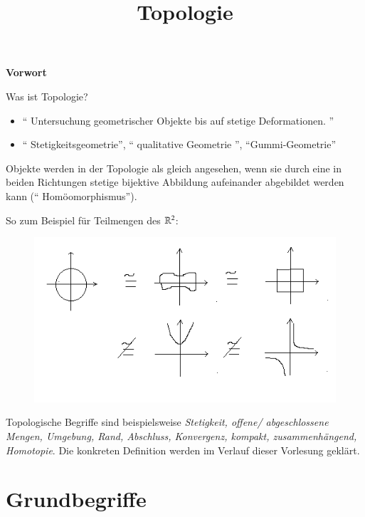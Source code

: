 \documentclass[a4paper,10pt]{scrartcl}
\title{Topologie}
\begin{document}
\maketitle

\tableofcontents
\newpage
\begin{center}
\LARGE\textbf{Vorwort}
\end{center}
\begin{seg}{Was ist Topologie?}
\begin{itemize}
\item "` Untersuchung geometrischer Objekte bis auf stetige Deformationen. "'
\item "` Stetigkeitsgeometrie"', "` qualitative Geometrie "', "`Gummi-Geometrie"'
\end{itemize}
Objekte werden in der Topologie als gleich angesehen, wenn sie durch eine in beiden Richtungen stetige bijektive Abbildung aufeinander abgebildet werden kann ("` Homöomorphismus"').
\end{seg}
So zum Beispiel für Teilmengen des $\mathbb{R}^2$:
\begin{figure}[h]
\includegraphics[scale=0.7]{fig1.png}
\end{figure}
\begin{ex*} 
Topologische Begriffe sind beispielsweise \emph{Stetigkeit, offene/ abgeschlossene Mengen, Umgebung, Rand, Abschluss, Konvergenz, kompakt, zusammenhängend, Homotopie}.  Die konkreten Definition werden im Verlauf dieser Vorlesung geklärt.
\end{ex*}
\section{Grundbegriffe}
\end{document}
